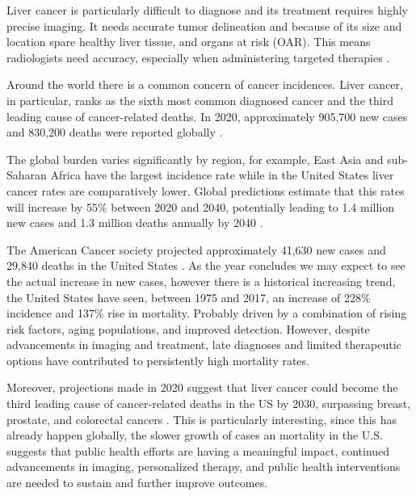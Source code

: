 \documentclass[11pt]{article} %
\begin{document}
\begin{multicols}{2}
Liver cancer is particularly difficult to diagnose and its treatment requires highly precise imaging. It needs accurate tumor delineation and because of its size and location spare healthy liver tissue, and organs at risk (OAR). This means radiologists need accuracy, especially when administering targeted therapies \cite{beaton2019, floridi2022}.

Around the world there is a common concern of cancer incidences. Liver cancer, in particular, ranks as the sixth most common diagnosed cancer and the third leading cause of cancer-related deaths. In 2020, approximately 905,700 new cases and 830,200 deaths were reported globally \cite{journal_of_hepatology2022}. 


The global burden varies significantly by region, for example, East Asia and sub-Saharan Africa have the largest incidence rate while in the United States liver cancer rates are comparatively lower. Global predictions estimate that this rates will increase by 55\% between 2020 and 2040, potentially leading to 1.4 million new cases and 1.3 million deaths annually by 2040 \cite{journal_of_hepatology2022}.

The American Cancer society projected approximately 41,630 new cases and 29,840 deaths in the United States \cite{cancer_stats2024}. As the year concludes we may expect to see the actual increase in new cases, however there is a historical increasing trend, the United States have seen, between 1975 and 2017, an increase of 228\% incidence and 137\% rise in mortality. Probably driven by a combination of rising risk factors, aging populations, and improved detection. However, despite advancements in imaging and treatment, late diagnoses and limited therapeutic options have contributed to persistently high mortality rates.

Moreover, projections made in 2020 suggest that liver cancer could become the third leading cause of cancer-related deaths in the US by 2030, surpassing breast, prostate, and colorectal cancers \cite{aacr_2030}. This is particularly interesting, since this has already happen globally, the slower growth of cases an mortality in the U.S. suggests that public health efforts are having a meaningful impact, continued advancements in imaging, personalized therapy, and public health interventions are needed to sustain and further improve outcomes.


\end{multicols}
\end{document}
